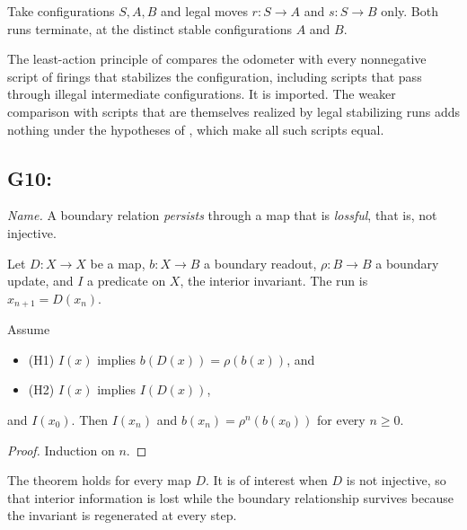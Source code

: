 \begin{example}\label{ex:G8-d}
Take configurations $S, A, B$ and legal moves $r : S \to A$ and $s : S \to B$ only. Both runs
terminate, at the distinct stable configurations $A$ and $B$.
\end{example}

\begin{remark}\label{rem:least-action}
The least-action principle of \citet{FeyLevinePeres2010} compares the odometer with every
nonnegative script of firings that stabilizes the configuration, including scripts that pass
through illegal intermediate configurations. It is imported. The weaker comparison with scripts
that are themselves realized by legal stabilizing runs adds nothing under the hypotheses of
, which make all such scripts equal.
\end{remark}

\subsection{G10: \lawGTen}\label{sec:G10}

\emph{Name.} A boundary relation \emph{persists} through a map that is \emph{lossful}, that is,
not injective.

Let $D : X \to X$ be a map, $b : X \to B$ a boundary readout, $\rho : B \to B$ a boundary update, and
$I$ a predicate on $X$, the interior invariant. The run is $x_{n+1} = D(x_n)$.

\begin{theorem}\label{thm:G10}
Assume
\begin{itemize}
  \item \textup{(H1)} $I(x)$ implies $b(D(x)) = \rho(b(x))$, and
  \item \textup{(H2)} $I(x)$ implies $I(D(x))$,
\end{itemize}
and $I(x_0)$. Then $I(x_n)$ and $b(x_n) = \rho^n(b(x_0))$ for every $n \ge 0$.
\end{theorem}

\begin{proof}
Induction on $n$.
\end{proof}

The theorem holds for every map $D$. It is of interest when $D$ is not injective, so that interior
information is lost while the boundary relationship survives because the invariant is regenerated
at every step.

